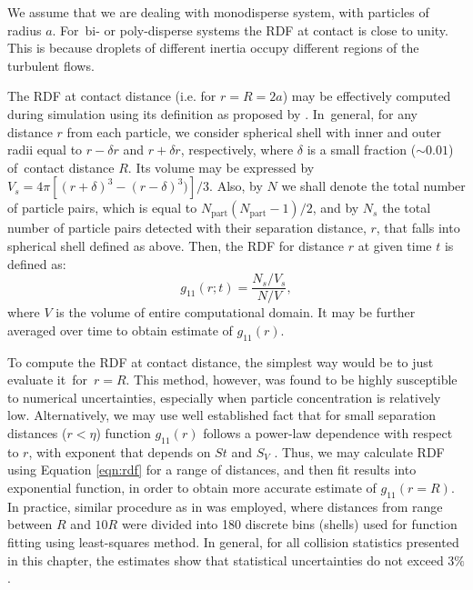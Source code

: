 \documentclass{pracamgren}
\begin{document}
We assume that we are dealing with monodisperse system, with particles of radius $a$.
For~bi- or poly-disperse systems the RDF at contact is close to unity.
This is because droplets of different inertia occupy different regions of the turbulent flows.

The RDF at contact distance (i.e. for $r = R = 2a$) may be effectively computed during simulation using its definition as proposed by \textcite{Wang2000,Zhou2001}.
In~general, for any distance $r$ from each particle, we consider spherical shell with inner and outer radii equal to $r - \delta r$ and $r + \delta r$, respectively, where $\delta$ is a small fraction ($\sim 0.01$) of~contact distance $R$.
Its volume may be expressed by $V_s = 4 \pi [(r + \delta)^3 - (r - \delta)^3)] / 3$.
Also, by $N$ we shall denote the total number of particle pairs, which is equal to $N_{\text{part}}(N_{\text{part}} - 1) / 2$, and by $N_s$ the total number of particle pairs detected with their separation distance, $r$, that falls into spherical shell defined as above.
Then, the RDF for distance $r$ at given time $t$ is defined as: 
\begin{equation}
g_{11}(r; t) = \frac{N_s / V_s}{N / V} ,
\label{eqn:rdf}
\end{equation}
where $V$ is the volume of entire computational domain.
It may be further averaged over time to obtain estimate of $g_{11}(r)$.

To compute the RDF at contact distance, the simplest way would be to just evaluate it~for~$r = R$.
This method, however, was found to be highly susceptible to numerical uncertainties, especially when particle concentration is relatively low.
Alternatively, we may use well established fact that for small separation distances ($r < \eta$) function $g_{11}(r)$ follows a power-law dependence with respect to $r$, with exponent that depends on $St$ and $S_V$ \parencite[Equation 11]{Rosa2013}.
Thus, we may calculate RDF using Equation \ref{eqn:rdf} for a range of distances, and then fit results into exponential function, in order to obtain more accurate estimate of $g_{11}(r = R)$.
In practice, similar procedure as in \textcite{Rosa2013} was employed, where distances from range between $R$ and $10R$ were divided into 180 discrete bins (shells) used for function fitting using least-squares method.
In general, for all collision statistics presented in this chapter, the estimates show that statistical uncertainties do not exceed $3 \%$.
\end{document}

